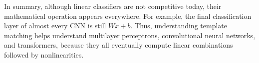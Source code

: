 \highspace
In summary, although linear classifiers are not competitive today, their mathematical operation appears everywhere. For example, the final classification layer of almost every CNN is still $Wx + b$. Thus, understanding template matching helps understand multilayer perceptrons, convolutional neural networks, and transformers, because they all eventually compute linear combinations followed by nonlinearities.